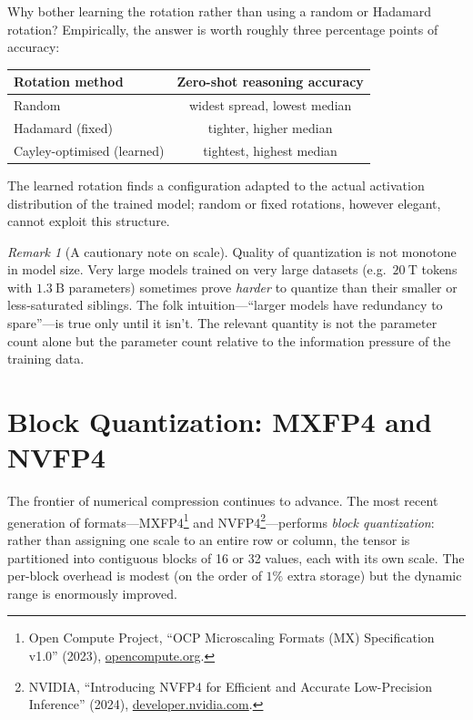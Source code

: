 \documentclass[11pt,a4paper]{article}
\theoremstyle{definition}
\theoremstyle{remark}
\newtheorem*{remark}{Remark}
\theoremstyle{plain}
\begin{document}
Why bother learning the rotation rather than using a random or Hadamard
rotation? Empirically, the answer is worth roughly three percentage points
of accuracy:

\begin{center}
\renewcommand{\arraystretch}{1.25}
\begin{tabular}{@{}lc@{}}
\toprule
\textbf{Rotation method} & \textbf{Zero-shot reasoning accuracy} \\
\midrule
Random                          & widest spread, lowest median \\
Hadamard (fixed)                & tighter, higher median \\
Cayley-optimised (learned)      & tightest, highest median \\
\bottomrule
\end{tabular}
\end{center}

The learned rotation finds a configuration adapted to the actual
activation distribution of the trained model; random or fixed rotations,
however elegant, cannot exploit this structure.

\begin{remark}[A cautionary note on scale]
Quality of quantization is not monotone in model size. Very large models
trained on very large datasets (e.g.\ $20~\text{T}$ tokens with
$1.3~\text{B}$ parameters) sometimes prove \emph{harder} to quantize than
their smaller or less-saturated siblings. The folk intuition---``larger
models have redundancy to spare''---is true only until it isn't. The
relevant quantity is not the parameter count alone but the parameter count
relative to the information pressure of the training data.
\end{remark}

\section{Block Quantization: MXFP4 and NVFP4}
\label{sec:fp4}

The frontier of numerical compression continues to advance. The most
recent generation of formats---MXFP4\footnote{Open Compute Project, ``OCP
Microscaling Formats (MX) Specification v1.0'' (2023),
\href{https://www.opencompute.org/documents/ocp-microscaling-formats-mx-v1-0-spec-final-pdf}{opencompute.org}.}
and NVFP4\footnote{NVIDIA, ``Introducing NVFP4 for Efficient and Accurate
Low-Precision Inference'' (2024),
\href{https://developer.nvidia.com/blog/introducing-nvfp4-for-efficient-and-accurate-low-precision-inference/}{developer.nvidia.com}.}---performs
\emph{block quantization}: rather than assigning one scale to an entire
row or column, the tensor is partitioned into contiguous blocks of 16 or
32 values, each with its own scale. The per-block overhead is modest (on
the order of $1\%$ extra storage) but the dynamic range is enormously
improved.
\end{document}
